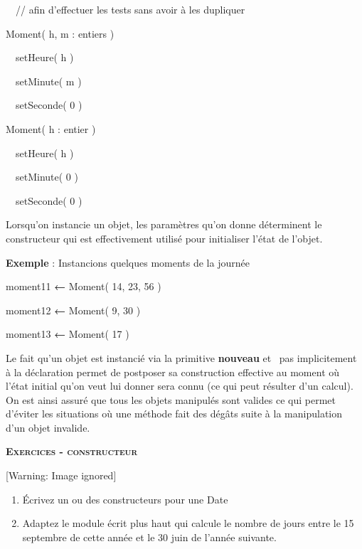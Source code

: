 {\sffamily
\ \ // afin d'effectuer les tests sans avoir à les
dupliquer }

{\sffamily
{}\textbf{ }}


\bigskip

{\sffamily
{}\textbf{ }Moment( h, m : entiers )}

{\sffamily
\ \ {setHeure( h )}}

{\sffamily
\ \ setMinute( m )}

{\sffamily
{\ \ }setSeconde( 0 )}

{\sffamily
{}}


\bigskip

{\sffamily
{} Moment( h : entier )}

{\sffamily
\ \ {setHeure( h )}}

{\sffamily
\ \ setMinute( 0 )}

{\sffamily
{\ \ }setSeconde( 0 )}

{\sffamily
{}}

{
Lorsqu'on instancie un objet, les paramètres
qu'on donne déterminent le constructeur qui est
effectivement utilisé pour initialiser l'état de
l'objet.}

{
\textbf{Exemple} : Instancions quelques moments de la journée}

{\sffamily
moment11\textbf{ }\textbf{←}\textbf{ } Moment(
14, 23, 56 )}

{\sffamily
moment12\textbf{ }\textbf{←}\textbf{ } Moment(
9, 30 )}

{\sffamily
moment13\textbf{ }\textbf{←}\textbf{ } Moment(
17 )}

{
Le fait qu'un objet est instancié via la primitive
\textbf{nouveau} et \ pas implicitement à la déclaration permet de
postposer sa construction effective au moment où
l'état initial qu'on veut lui donner
sera connu (ce qui peut résulter d'un calcul). On est
ainsi assuré que tous les objets manipulés sont valides ce qui permet
d’éviter les situations où une méthode fait des dégâts suite à la
manipulation d’un objet invalide.}

{\sffamily\bfseries\scshape
Exercices - constructeur}

\begin{center}
 [Warning: Image ignored] %

\end{center}
\liststyleWWviiiNumi
\begin{enumerate}
\item {
Écrivez un ou des constructeurs pour une Date}
\item {
Adaptez le module écrit plus haut qui calcule le nombre de jours entre
le 15 septembre de cette année et le 30 juin de
l'année suivante.}
\end{enumerate}

